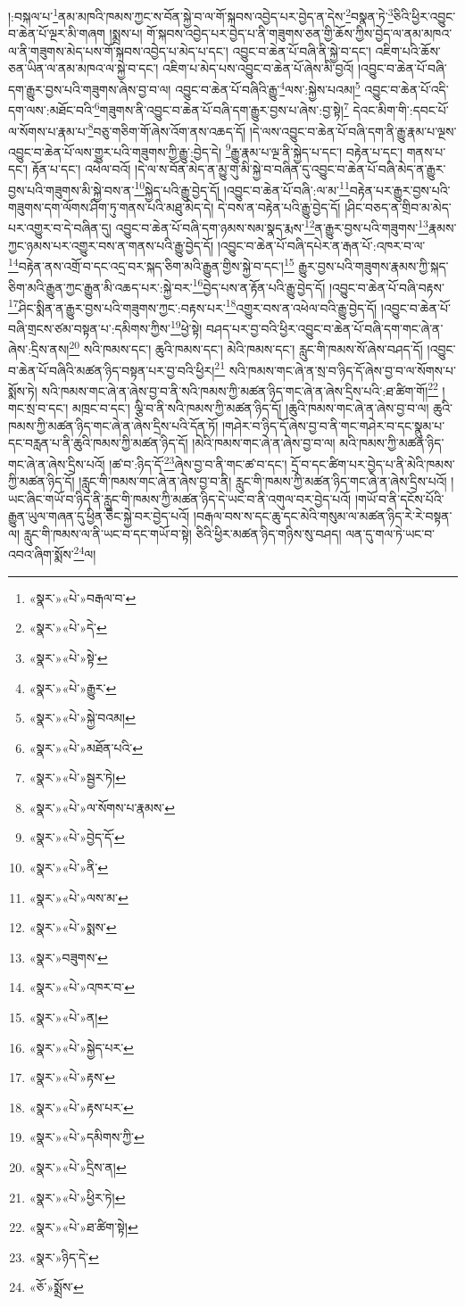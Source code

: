 །:བསྐལ་པ་\footnote{«སྣར་»«པེ་»བརྒལ་བ་}ནམ་མཁའི་ཁམས་ཀྱང་ས་བོན་སྐྱེ་བ་ལ་གོ་སྐབས་འབྱེད་པར་བྱེད་ན་དེས་\footnote{«སྣར་»«པེ་»དེ་}བསྣན་ཏེ་\footnote{«སྣར་»«པེ་»སྟེ་}ཅིའི་ཕྱིར་འབྱུང་བ་ཆེན་པོ་ལྔར་མི་གཞག །སྨྲས་པ། གོ་སྐབས་འབྱེད་པར་བྱེད་པ་ནི་གཟུགས་ཅན་གྱི་ཆོས་ཀྱིས་བྱེད་ལ་ནམ་མཁའ་ལ་ནི་གཟུགས་མེད་པས་གོ་སྐབས་འབྱེད་པ་མེད་པ་དང་། འབྱུང་བ་ཆེན་པོ་བཞི་ནི་སྐྱེ་བ་དང་། འཇིག་པའི་ཆོས་ཅན་ཡིན་ལ་ནམ་མཁའ་ལ་སྐྱེ་བ་དང་། འཇིག་པ་མེད་པས་འབྱུང་བ་ཆེན་པོ་ཞེས་མི་བྱའོ། །འབྱུང་བ་ཆེན་པོ་བཞི་དག་རྒྱུར་བྱས་པའི་གཟུགས་ཞེས་བྱ་བ་ལ། འབྱུང་བ་ཆེན་པོ་བཞིའི་རྒྱུ་\footnote{«སྣར་»«པེ་»རྒྱུར་}ལས་:སྐྱེས་པའམ།\footnote{«སྣར་»«པེ་»སྐྱེ་བའམ།} འབྱུང་བ་ཆེན་པོ་འདི་དག་ལས་:མཐོང་བའི་\footnote{«སྣར་»«པེ་»མཐོན་པའི་}གཟུགས་ནི་འབྱུང་བ་ཆེན་པོ་བཞི་དག་རྒྱུར་བྱས་པ་ཞེས་:བྱ་སྟེ།\footnote{«སྣར་»«པེ་»སྦྱར་ཏེ།} དེའང་མིག་གི་:དབང་པོ་ལ་སོགས་པ་རྣམ་པ་\footnote{«སྣར་»«པེ་»ལ་སོགས་པ་རྣམས་}བཅུ་གཅིག་གོ་ཞེས་འོག་ནས་འཆད་དོ། །དེ་ལས་འབྱུང་བ་ཆེན་པོ་བཞི་དག་ནི་རྒྱུ་རྣམ་པ་ལྔས་འབྱུང་བ་ཆེན་པོ་ལས་གྱུར་པའི་གཟུགས་ཀྱི་རྒྱུ་:བྱེད་དེ། \footnote{«སྣར་»«པེ་»བྱེད་དོ་}རྒྱུ་རྣམ་པ་ལྔ་ནི་སྐྱེད་པ་དང་། བརྟེན་པ་དང་། གནས་པ་དང་། རྟོན་པ་དང་། འཕེལ་བའོ། །དེ་ལ་ས་བོན་མེད་ན་མྱུ་གུ་མི་སྐྱེ་བ་བཞིན་དུ་འབྱུང་བ་ཆེན་པོ་བཞི་མེད་ན་རྒྱུར་བྱས་པའི་གཟུགས་མི་སྐྱེ་བས་ན་\footnote{«སྣར་»«པེ་»ནི་}སྐྱེད་པའི་རྒྱུ་བྱེད་དོ། །འབྱུང་བ་ཆེན་པོ་བཞི་:ལ་མ་\footnote{«སྣར་»«པེ་»ལས་མ་}བརྟེན་པར་རྒྱུར་བྱས་པའི་གཟུགས་དག་ལོགས་ཤིག་ཏུ་གནས་པའི་མཐུ་མེད་དེ། དེ་བས་ན་བརྟེན་པའི་རྒྱུ་བྱེད་དོ། །ཤིང་བཅད་ན་གྲིབ་མ་མེད་པར་འགྱུར་བ་དེ་བཞིན་དུ། འབྱུང་བ་ཆེན་པོ་བཞི་དག་ཉམས་སམ་སྣད་རྨས་\footnote{«སྣར་»«པེ་»སྨས་}ན་རྒྱུར་བྱས་པའི་གཟུགས་\footnote{«སྣར་»བཟུགས་}རྣམས་ཀྱང་ཉམས་པར་འགྱུར་བས་ན་གནས་པའི་རྒྱུ་བྱེད་དོ། །འབྱུང་བ་ཆེན་པོ་བཞི་དཔེར་ན་རྒན་པོ་:འཁར་བ་ལ་\footnote{«སྣར་»«པེ་»འཁར་བ་}བརྟེན་ནས་འགྲོ་བ་དང་འདྲ་བར་སྐད་ཅིག་མའི་རྒྱུན་གྱིས་སྐྱེ་བ་དང་།\footnote{«སྣར་»«པེ་»ན།} རྒྱུར་བྱས་པའི་གཟུགས་རྣམས་ཀྱི་སྐད་ཅིག་མའི་རྒྱུན་ཀྱང་རྒྱུན་མི་འཆད་པར་:སྐྱེ་བར་\footnote{«སྣར་»«པེ་»སྐྱེད་པར་}བྱེད་པས་ན་རྟོན་པའི་རྒྱུ་བྱེད་དོ། །འབྱུང་བ་ཆེན་པོ་བཞི་བརྟས་\footnote{«སྣར་»«པེ་»རྟས་}ཤིང་སྨིན་ན་རྒྱུར་བྱས་པའི་གཟུགས་ཀྱང་:བརྟས་པར་\footnote{«སྣར་»«པེ་»རྟས་པར་}འགྱུར་བས་ན་འཕེལ་བའི་རྒྱུ་བྱེད་དོ། །འབྱུང་བ་ཆེན་པོ་བཞི་གྲངས་ཙམ་བསྟན་པ་:དམིགས་ཀྱིས་\footnote{«སྣར་»«པེ་»དམིགས་ཀྱི་}ཕྱེ་སྟེ། བཤད་པར་བྱ་བའི་ཕྱིར་འབྱུང་བ་ཆེན་པོ་བཞི་དག་གང་ཞེ་ན་ཞེས་:དྲིས་ནས།\footnote{«སྣར་»«པེ་»དྲིས་ན།} སའི་ཁམས་དང་། ཆུའི་ཁམས་དང་། མེའི་ཁམས་དང་། རླུང་གི་ཁམས་སོ་ཞེས་བཤད་དོ། །འབྱུང་བ་ཆེན་པོ་བཞིའི་མཚན་ཉིད་བསྟན་པར་བྱ་བའི་ཕྱིར།\footnote{«སྣར་»«པེ་»ཕྱིར་ཏེ།} སའི་ཁམས་གང་ཞེ་ན་སྲ་བ་ཉིད་དོ་ཞེས་བྱ་བ་ལ་སོགས་པ་སྨོས་ཏེ། སའི་ཁམས་གང་ཞེ་ན་ཞེས་བྱ་བ་ནི་སའི་ཁམས་ཀྱི་མཚན་ཉིད་གང་ཞེ་ན་ཞེས་དྲིས་པའི་:ཐ་ཚིག་གོ།\footnote{«སྣར་»«པེ་»ཐ་ཚིག་སྟེ།} །གང་སྲ་བ་དང་། མཁྲང་བ་དང་། ལྕི་བ་ནི་སའི་ཁམས་ཀྱི་མཚན་ཉིད་དོ། །ཆུའི་ཁམས་གང་ཞེ་ན་ཞེས་བྱ་བ་ལ། ཆུའི་ཁམས་ཀྱི་མཚན་ཉིད་གང་ཞེ་ན་ཞེས་དྲིས་པའི་དོན་ཏོ། །གཤེར་བ་ཉིད་དོ་ཞེས་བྱ་བ་ནི་གང་གཤེར་བ་དང་སྣུམ་པ་དང་བརླན་པ་ནི་ཆུའི་ཁམས་ཀྱི་མཚན་ཉིད་དོ། །མེའི་ཁམས་གང་ཞེ་ན་ཞེས་བྱ་བ་ལ། མའི་ཁམས་ཀྱི་མཚན་ཉིད་གང་ཞེ་ན་ཞེས་དྲིས་པའོ། །ཚ་བ་:ཉིད་དོ་\footnote{«སྣར་»ཉིད་དེ་}ཞེས་བྱ་བ་ནི་གང་ཚ་བ་དང་། དྲོ་བ་དང་ཚིག་པར་བྱེད་པ་ནི་མེའི་ཁམས་ཀྱི་མཚན་ཉིད་དོ། །རླུང་གི་ཁམས་གང་ཞེ་ན་ཞེས་བྱ་བ་ནི། རླུང་གི་ཁམས་ཀྱི་མཚན་ཉིད་གང་ཞེ་ན་ཞེས་དྲིས་པའོ། །ཡང་ཞིང་གཡོ་བ་ཉིད་ནི་རླུང་གི་ཁམས་ཀྱི་མཚན་ཉིད་དེ་ཡང་བ་ནི་འགུལ་བར་བྱེད་པའོ། །གཡོ་བ་ནི་དངོས་པོའི་རྒྱུན་ཡུལ་གཞན་དུ་ཕྱིན་ཅིང་སྐྱེ་བར་བྱེད་པའོ། །བརྒལ་བས་ས་དང་ཆུ་དང་མེའི་གསུམ་ལ་མཚན་ཉིད་རེ་རེ་བསྟན་ལ། རླུང་གི་ཁམས་ལ་ནི་ཡང་བ་དང་གཡོ་བ་སྟེ། ཅིའི་ཕྱིར་མཚན་ཉིད་གཉིས་སུ་བཤད། ལན་དུ་གལ་ཏེ་ཡང་བ་འབའ་ཞིག་སྨོས་\footnote{«ཅོ་»སྨྲོས་}ལ། 